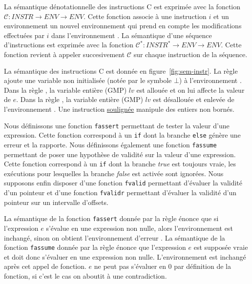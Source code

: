 La sémantique dénotationnelle des instructions C est exprimée avec la fonction
$\mathcal{C} : INSTR \rightarrow ENV \rightarrow ENV$.
Cette fonction associe à une instruction $i$ et un environnement \env un nouvel
environnement qui prend en compte les modifications effectuées par $i$ dans
l'environnement \env.
La sémantique d'une séquence d'instructions est exprimée avec la fonction
$\mathcal{C}^{*} : INSTR^{*} \rightarrow ENV \rightarrow ENV$.
Cette fonction revient à appeler succesivement $\mathcal{C}$ sur chaque
instruction de la séquence.




La sémantique des instructions C est donnée en figure~\ref{fig:sem-instr}.
La règle  ajoute une variable non initialisée (notée par le
symbole $\bot$) à l'environnement \env.
Dans la règle , la variable entière (GMP) $\mathit{lv}$ est
allouée et on lui affecte la valeur de $e$.
Dans la règle , la variable entière (GMP) $\mathit{lv}$
est désallouée et enlevée de l'environnement \env.
Une instruction \underline{soulignée} manipule des entiers non bornés.

Nous définissons une fonction \lstinline'fassert' permettant de tester la valeur
d'une expression.
Cette fonction correspond à un \lstinline'if' dont la branche
\lstinline'else' génère une erreur et la rapporte.
Nous définissons également une fonction \lstinline'fassume' permettant de poser
une hypothèse de validité sur la valeur d'une expression.
Cette fonction correspond à un \lstinline'if' dont
la branche \textit{true} est toujours vraie, les exécutions pour lesquelles
la branche \textit{false} est activée sont ignorées.
Nous supposons enfin disposer d'une fonction \lstinline'fvalid' permettant
d'évaluer la validité d'un pointeur et d'une fonction \lstinline'fvalidr'
permettant d'évaluer la validité d'un pointeur sur un intervalle d'offsets.

La sémantique de la fonction \lstinline'fassert' donnée par la règle
 énonce que si l'expression $e$ s'évalue en une
expression non nulle, alors l'environnement \env est inchangé, sinon on obtient
l'environnement d'erreur \errorenv.
La sémantique de la fonction \lstinline'fassume' donnée par la règle
 énonce que l'expression $e$ est supposée vraie et
doit donc s'évaluer en une expression non nulle.
L'environnement est inchangé après cet appel de fonction.
$e$ ne peut pas s'évaluer en $0$ par définition de la fonction, si c'est
le cas on aboutit à une contradiction.

